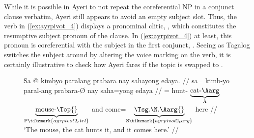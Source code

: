 While it is possible in Ayeri to not repeat the coreferential NP in a conjunct
clause verbatim, Ayeri still appears to avoid an empty subject slot. Thus, the
verb  in (\ref{ex:ayrpivot_4}) displays a
pronominal clitic, , which constitutes the resumptive
subject pronoun of the clause. In (\ref{ex:ayrpivot_4}) at least, this pronoun
is coreferential with the subject in the first conjunct,
. Seeing as Tagalog switches the subject around by
altering the voice marking on the verb, it is certainly illustrative to check
how Ayeri fares if the topic is swapped to .

\begin{figure}[h]
\ex\label{ex:ayrpivot2}
\begingl[aboveglftskip=1em]
	\gla Sa @ kimbyo paralang prabara nay sahayong edaya. //
	\glb sa= kimb-yo paral-ang prabara-Ø nay saha=yong edaya  //
	\glc \PatT{}= hunt-\TsgN{}
		$\underbrace{\text{cat-\Aarg}}_{\text{A}}$
		$\underbrace{\text{mouse-\Top{}}}_{\text{P}\tikzmark{ayrpivot2_ctrl}}$
		and
		come=$\underbrace{\text{\smash{\TsgN{}}.\Aarg{}}}_%
			{\text{S}\tikzmark{ayrpivot2_targ}}$
		here //
	\glft `The mouse, the cat hunts it, and it comes here.' //
\endgl

\xe
\end{figure}

